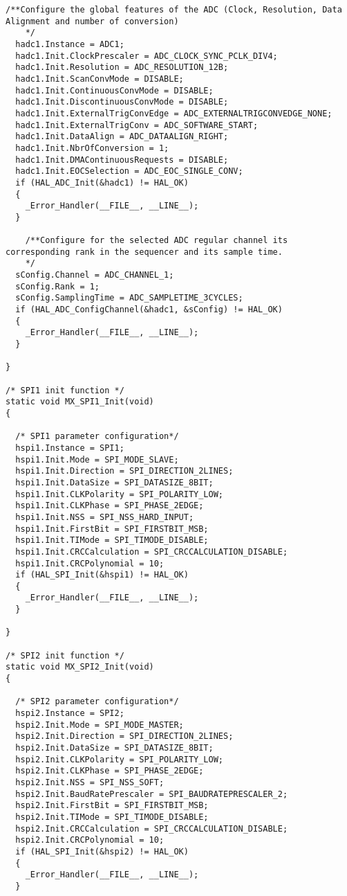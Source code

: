 \begin{lstlisting}[label=algoritmo:main.c,style = STM-code,frame=single,caption=main.c]
    /**Configure the global features of the ADC (Clock, Resolution, Data Alignment and number of conversion) 
    */
  hadc1.Instance = ADC1;
  hadc1.Init.ClockPrescaler = ADC_CLOCK_SYNC_PCLK_DIV4;
  hadc1.Init.Resolution = ADC_RESOLUTION_12B;
  hadc1.Init.ScanConvMode = DISABLE;
  hadc1.Init.ContinuousConvMode = DISABLE;
  hadc1.Init.DiscontinuousConvMode = DISABLE;
  hadc1.Init.ExternalTrigConvEdge = ADC_EXTERNALTRIGCONVEDGE_NONE;
  hadc1.Init.ExternalTrigConv = ADC_SOFTWARE_START;
  hadc1.Init.DataAlign = ADC_DATAALIGN_RIGHT;
  hadc1.Init.NbrOfConversion = 1;
  hadc1.Init.DMAContinuousRequests = DISABLE;
  hadc1.Init.EOCSelection = ADC_EOC_SINGLE_CONV;
  if (HAL_ADC_Init(&hadc1) != HAL_OK)
  {
    _Error_Handler(__FILE__, __LINE__);
  }

    /**Configure for the selected ADC regular channel its corresponding rank in the sequencer and its sample time. 
    */
  sConfig.Channel = ADC_CHANNEL_1;
  sConfig.Rank = 1;
  sConfig.SamplingTime = ADC_SAMPLETIME_3CYCLES;
  if (HAL_ADC_ConfigChannel(&hadc1, &sConfig) != HAL_OK)
  {
    _Error_Handler(__FILE__, __LINE__);
  }

}

/* SPI1 init function */
static void MX_SPI1_Init(void)
{

  /* SPI1 parameter configuration*/
  hspi1.Instance = SPI1;
  hspi1.Init.Mode = SPI_MODE_SLAVE;
  hspi1.Init.Direction = SPI_DIRECTION_2LINES;
  hspi1.Init.DataSize = SPI_DATASIZE_8BIT;
  hspi1.Init.CLKPolarity = SPI_POLARITY_LOW;
  hspi1.Init.CLKPhase = SPI_PHASE_2EDGE;
  hspi1.Init.NSS = SPI_NSS_HARD_INPUT;
  hspi1.Init.FirstBit = SPI_FIRSTBIT_MSB;
  hspi1.Init.TIMode = SPI_TIMODE_DISABLE;
  hspi1.Init.CRCCalculation = SPI_CRCCALCULATION_DISABLE;
  hspi1.Init.CRCPolynomial = 10;
  if (HAL_SPI_Init(&hspi1) != HAL_OK)
  {
    _Error_Handler(__FILE__, __LINE__);
  }

}

/* SPI2 init function */
static void MX_SPI2_Init(void)
{

  /* SPI2 parameter configuration*/
  hspi2.Instance = SPI2;
  hspi2.Init.Mode = SPI_MODE_MASTER;
  hspi2.Init.Direction = SPI_DIRECTION_2LINES;
  hspi2.Init.DataSize = SPI_DATASIZE_8BIT;
  hspi2.Init.CLKPolarity = SPI_POLARITY_LOW;
  hspi2.Init.CLKPhase = SPI_PHASE_2EDGE;
  hspi2.Init.NSS = SPI_NSS_SOFT;
  hspi2.Init.BaudRatePrescaler = SPI_BAUDRATEPRESCALER_2;
  hspi2.Init.FirstBit = SPI_FIRSTBIT_MSB;
  hspi2.Init.TIMode = SPI_TIMODE_DISABLE;
  hspi2.Init.CRCCalculation = SPI_CRCCALCULATION_DISABLE;
  hspi2.Init.CRCPolynomial = 10;
  if (HAL_SPI_Init(&hspi2) != HAL_OK)
  {
    _Error_Handler(__FILE__, __LINE__);
  }


\end{lstlisting}
